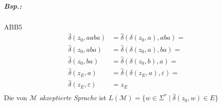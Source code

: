 \subparagraph{Bsp.:} \parskp
ABB5
\begin{align*}
\hat{\delta}(z_0, aaba) &= \hat{\delta}(\delta(z_0,a),aba)=\\
\hat{\delta}(z_0, aba) &= \hat{\delta}(\delta(z_0,a),ba)=\\
\hat{\delta}(z_0, ba) &= \hat{\delta}(\delta(z_0,b),a)=\\
\hat{\delta}(z_E, a) &= \hat{\delta}(\delta(z_E,a), \varepsilon)=\\
\hat{\delta}(z_E, \varepsilon) &= z_E\\
\end{align*}
Die von $\mathcal{M}$ \emph{akzeptierte Sprache} ist $L(\mathcal{M})=\{w\in \Sigma^* \;|\; \hat{\delta}(z_0, w) \in E\}$

\newpage
\printbibliography
